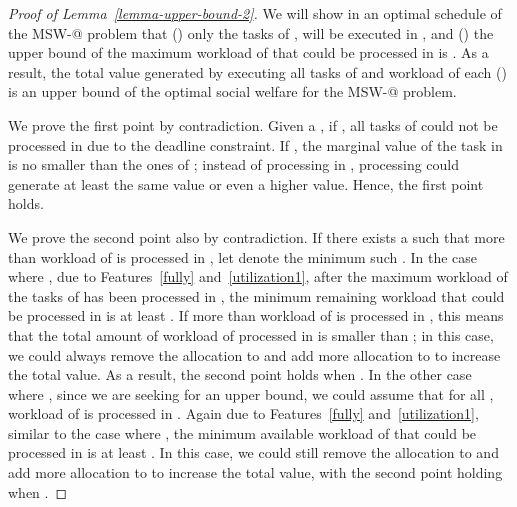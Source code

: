 \documentclass[10pt,journal,compsoc]{IEEEtran}
\makeatletter
\newcommand{\rmnum}[1]{\romannumeral #1}
\newcommand{\Rmnum}[1]{\expandafter\@slowromancap\romannumeral #1@}
\makeatother
\begin{document}
\begin{proof}[Proof of Lemma~\ref{lemma-upper-bound-2}]
We will show in an optimal schedule of the MSW-\Rmnum{2} problem that (\rmnum{1}) only the tasks of ,  will be executed in , and (\rmnum{2}) the upper bound of the maximum workload of  that could be processed in  is . As a result, the total value generated by executing all tasks of  and  workload of each  () is an upper bound of the optimal social welfare for the MSW-\Rmnum{2} problem.


We prove the first point by contradiction. Given a , if , all tasks of  could not be processed in  due to the deadline constraint. If , the marginal value of the task in  is no smaller than the ones of ; instead of processing  in , processing  could generate at least the same value or even a higher value. Hence, the first point holds.


We prove the second point also by contradiction. If there exists a  such that more than  workload of  is processed in , let  denote the minimum such . In the case where , due to Features~\ref{fully} and~\ref{utilization1}, after the maximum workload of the tasks of  has been processed in , the minimum remaining workload that could be processed in  is at least . If more than  workload of  is processed in , this means that the total amount of workload of  processed in  is smaller than ; in this case, we could always remove the allocation to  and add more allocation to  to increase the total value. As a result, the second point holds when . In the other case where , since we are seeking for an upper bound, we could assume that for all ,  workload of  is processed in . Again due to Features~\ref{fully} and~\ref{utilization1}, similar to the case where , the minimum available workload of  that could be processed in  is at least . In this case, we could still remove the allocation to  and add more allocation to  to increase the total value, with the second point holding when .
\end{proof}
\end{document}
